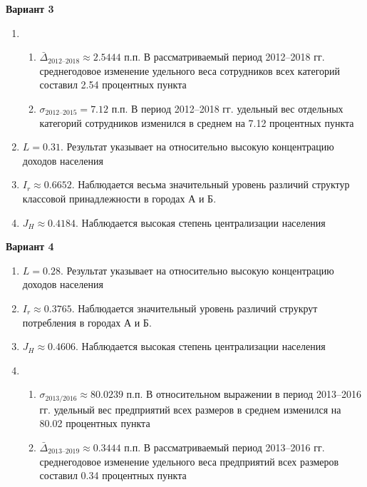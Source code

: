 \documentclass{article}
\begin{document}
\textbf{Вариант 3}
\begin{enumerate}
\item \begin{enumerate} \item $\bar\Delta_\text{2012--2018}\approx 2.5444$ п.п. В рассматриваемый период 2012--2018 гг. среднегодовое изменение удельного веса сотрудников всех категорий составил 2.54 процентных пункта
\item $\sigma_\text{2012--2015}= 7.12$ п.п. В период 2012--2018 гг. удельный вес отдельных категорий сотрудников изменился в среднем на 7.12 процентных пункта\end{enumerate}
\item $L= 0.31$. Результат указывает на относительно высокую концентрацию доходов населения
\item $I_r\approx 0.6652$. Наблюдается весьма значительный уровень различий структур классовой принадлежности в городах А и Б.
\item $J_H \approx 0.4184$. Наблюдается высокая степень централизации населения
\end{enumerate}

\textbf{Вариант 4}
\begin{enumerate}
\item $L= 0.28$. Результат указывает на относительно высокую концентрацию доходов населения
\item $I_r\approx 0.3765$. Наблюдается значительный уровень различий струкрут потребления в городах А и Б.
\item $J_H \approx 0.4606$. Наблюдается высокая степень централизации населения
\item \begin{enumerate} \item $\sigma_\text{2013/2016}\approx 80.0239$ п.п. В относительном выражении в период 2013--2016 гг. удельный вес предприятий всех размеров в среднем изменился на 80.02 процентных пункта
\item $\bar\Delta_\text{2013--2019}\approx 0.3444$ п.п. В рассматриваемый период 2013--2016 гг. среднегодовое изменение удельного веса предприятий всех размеров составил 0.34 процентных пункта\end{enumerate}
\end{enumerate}
\end{document}
